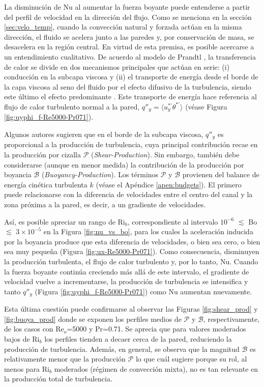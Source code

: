 La disminución de Nu al aumentar la fuerza boyante puede entenderse a partir del perfil de velocidad en la dirección del flujo. Como se menciona en la sección \ref{sec:velo_temp}, cuando la convección natural y forzada actúan en la misma dirección, el fluido se acelera junto a las paredes y, por conservación de masa, se desacelera en la región central. En virtud de esta premisa, es posible acercarse a un entendimiento cualitativo. De acuerdo al modelo de Prandtl \cite{Prandtl1942}, la transferencia de calor se divide en dos mecanismos principales que actúan en serie: (i) conducción en la subcapa viscosa y (ii) el transporte de energía desde el borde de la capa viscosa al seno del fluido por el efecto difusivo de la turbulencia, siendo este último el efecto predominante \cite{aicher1997}. Este transporte de energía hace referencia al flujo de calor turbulento normal a la pared, $q''_y = \langle u^{* \prime}_y \theta^{* \prime} \rangle$ (véase Figura \ref{fig:uyphi_f-Re5000-Pr071}). 

Algunos autores \cite{aicher1997, hall1969laminarization} sugieren que en el borde de la subcapa viscosa,  $q''_y$ es proporcional a la producción de turbulencia, cuya principal contribución recae en la producción por cizalla $\mathcal{P}$ (\textit{Shear-Production}). Sin embargo, también debe considerarse (aunque en menor medida) la contribución de la producción por boyancia $\mathcal{B}$ (\textit{Buoyancy-Production}). Los términos $\mathcal{P}$ y $\mathcal{B}$ provienen del balance de energía cinética turbulenta $k$  (véase el Apéndice \ref{apen:budgets}). El primero puede relacionarse con la diferencia de velocidades entre el centro del canal y la zona próxima a la pared, es decir, a un gradiente de velocidades.

Así, es posible apreciar un rango de Ri$_b$, correspondiente al intervalo $10^{-6}$ $\lesssim$ Bo $\lesssim$ $3 \times 10^{-5}$ en la Figura \ref{fig:nu_vs_bo}, para los cuales la aceleración inducida por la boyancia produce que esta diferencia de velocidades, o bien sea cero, o bien sea muy pequeña (Figura \ref{fig:ux-Re5000-Pr071}). Como consecuencia, disminuyen la producción turbulenta, el flujo de calor turbulento y, por lo tanto, Nu. Cuando la fuerza boyante continúa creciendo más allá de este intervalo, el gradiente de velocidad vuelve a incrementarse, la producción de turbulencia se intensifica y tanto $q''_y$ (Figura \ref{fig:uyphi_f-Re5000-Pr071}) como Nu aumentan nuevamente. 

Esta última cuestión puede confirmarse al observar las Figuras \ref{fig:shear_prod} y \ref{fig:buoya_prod} donde se exponen los perfiles medios de $\mathcal{P}$ y $\mathcal{B}$, respectivamente, de los casos con Re$_o$=5000 y Pr=0.71. Se aprecia que para valores moderados bajos de Ri$_b$ los perfiles tienden a decaer cerca de la pared, reduciendo la producción de turbulencia. Además, en general, se observa que la magnitud $\mathcal{B}$ es relativamente menor que la producción $\mathcal{P}$ lo que cuál sugiere porque su rol, al menos para Ri$_b$ moderados (régimen de convección mixta), no es tan relevante en la producción total de turbulencia.

